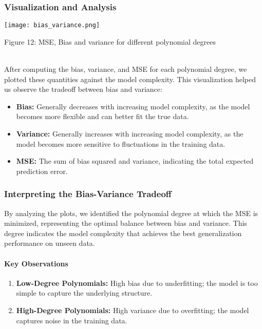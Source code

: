 \documentclass{article}
\begin{document}
\begin{enumerate}
\subsubsection{Visualization and Analysis}

\texttt{[image: bias\_variance.png]}
\caption{Figure 12: MSE, Bias and variance for different polynomial degrees }
\label{fig:enter-label}\\
    
After computing the bias, variance, and MSE for each polynomial degree, we plotted these quantities against the model complexity. This visualization helped us observe the tradeoff between bias and variance:

\begin{itemize} \item \textbf{Bias:} Generally decreases with increasing model complexity, as the model becomes more flexible and can better fit the true data. \item \textbf{Variance:} Generally increases with increasing model complexity, as the model becomes more sensitive to fluctuations in the training data. \item \textbf{MSE:} The sum of bias squared and variance, indicating the total expected prediction error. \end{itemize}

\subsubsection{Interpreting the Bias-Variance Tradeoff}

By analyzing the plots, we identified the polynomial degree at which the MSE is minimized, representing the optimal balance between bias and variance. This degree indicates the model complexity that achieves the best generalization performance on unseen data.
\newline\newline




\paragraph{Key Observations}

\begin{enumerate} 
\item \textbf{Low-Degree Polynomials:} High bias due to underfitting; the model is too simple to capture the underlying structure. 
\item \textbf{High-Degree Polynomials:} High variance due to overfitting; the model captures noise in the training data. 
\end{enumerate}



\end{enumerate}
\end{document}

